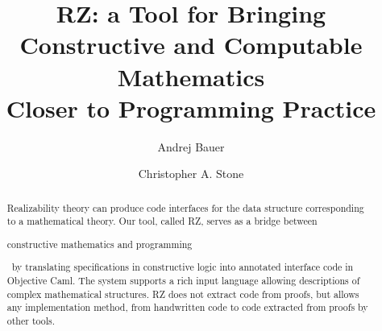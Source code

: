 \documentclass{llncs}
\newif\iflong
\begin{document}
\title{RZ: a Tool for Bringing\\
  Constructive and Computable Mathematics\\
  Closer to Programming Practice}
\author{
  Andrej Bauer \and
  Christopher A. Stone}

\maketitle

\begin{abstract}
  Realizability theory 
\iflong 
  is not just a fundamental tool in logic
  and computability.  It also 
  has direct application to the design and
  implementation of programs, since it
\fi %
  can produce code interfaces for the data
  structure corresponding to a
  mathematical theory.
%
  Our tool, called RZ,
  serves as a bridge between
\iflong the worlds of \fi
  constructive
  mathematics and programming%
\iflong 
.
By using the realizability
  interpretation of constructive mathematics, RZ 
  translates
\else
\ by translating
\fi %
  specifications in constructive logic into annotated
  interface code in Objective Caml.
%
  The system supports
  a rich input language allowing descriptions of
  complex mathematical structures. RZ does not extract code from
  proofs, but allows any implementation method, from handwritten code to code extracted from
  proofs by other tools.
\end{abstract}

\iffalse
\begin{center}
  Version of \today.
\end{center}
\fi











{

}

\iflong
\appendix

\fi %
\end{document}
